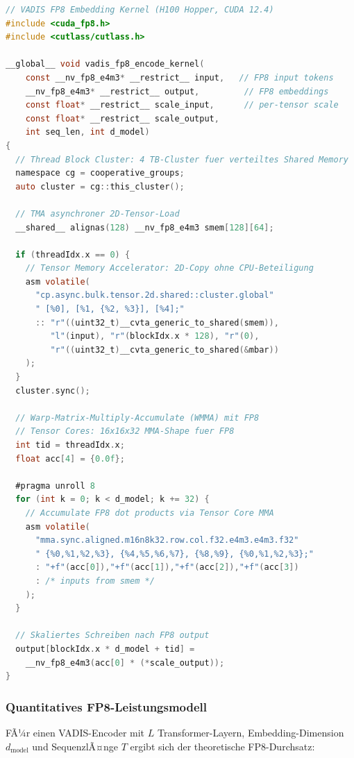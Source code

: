 ﻿\documentclass[12pt,a4paper]{article}
\begin{document}
\begin{lstlisting}[language=C, caption={FP8-Transformer-Engine-Kernel fÃ¼r VADIS Encoder-Inferenz (CUDA 12.4)}]
// VADIS FP8 Embedding Kernel (H100 Hopper, CUDA 12.4)
#include <cuda_fp8.h>
#include <cutlass/cutlass.h>

__global__ void vadis_fp8_encode_kernel(
    const __nv_fp8_e4m3* __restrict__ input,   // FP8 input tokens
    __nv_fp8_e4m3* __restrict__ output,         // FP8 embeddings
    const float* __restrict__ scale_input,      // per-tensor scale
    const float* __restrict__ scale_output,
    int seq_len, int d_model)
{
  // Thread Block Cluster: 4 TB-Cluster fuer verteiltes Shared Memory
  namespace cg = cooperative_groups;
  auto cluster = cg::this_cluster();
  
  // TMA asynchroner 2D-Tensor-Load
  __shared__ alignas(128) __nv_fp8_e4m3 smem[128][64];
  
  if (threadIdx.x == 0) {
    // Tensor Memory Accelerator: 2D-Copy ohne CPU-Beteiligung
    asm volatile(
      "cp.async.bulk.tensor.2d.shared::cluster.global"
      " [%0], [%1, {%2, %3}], [%4];"
      :: "r"((uint32_t)__cvta_generic_to_shared(smem)),
         "l"(input), "r"(blockIdx.x * 128), "r"(0),
         "r"((uint32_t)__cvta_generic_to_shared(&mbar))
    );
  }
  cluster.sync();
  
  // Warp-Matrix-Multiply-Accumulate (WMMA) mit FP8
  // Tensor Cores: 16x16x32 MMA-Shape fuer FP8
  int tid = threadIdx.x;
  float acc[4] = {0.0f};
  
  #pragma unroll 8
  for (int k = 0; k < d_model; k += 32) {
    // Accumulate FP8 dot products via Tensor Core MMA
    asm volatile(
      "mma.sync.aligned.m16n8k32.row.col.f32.e4m3.e4m3.f32"
      " {%0,%1,%2,%3}, {%4,%5,%6,%7}, {%8,%9}, {%0,%1,%2,%3};"
      : "+f"(acc[0]),"+f"(acc[1]),"+f"(acc[2]),"+f"(acc[3])
      : /* inputs from smem */
    );
  }
  
  // Skaliertes Schreiben nach FP8 output
  output[blockIdx.x * d_model + tid] = 
    __nv_fp8_e4m3(acc[0] * (*scale_output));
}
\end{lstlisting}

\subsubsection{Quantitatives FP8-Leistungsmodell}

FÃ¼r einen VADIS-Encoder mit $L$ Transformer-Layern,
Embedding-Dimension $d_{\text{model}}$ und SequenzlÃ¤nge $T$
ergibt sich der theoretische FP8-Durchsatz:
\end{document}
